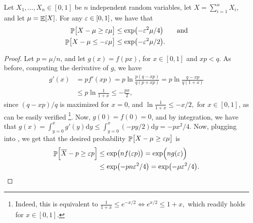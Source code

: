 \begin{theorem}
    Let $X_1, \ldots, X_n \in [0,1]$ be $n$ independent random
    variables, let $X = \sum_{i=1}^n X_i$, and let $\mu = \mathop{\mathbb{E}}\!\left[ {X} \right]$.
    For any ${\varepsilon} \in [0,1]$, we have that
    \begin{align*}
        \Prob{\bigl.{X} - \mu \geq \eps \mu }
        &\leq
        \exp\pth{ -\eps^2 \mu / 4}
        \qquad\text{and} \\
        \Prob{\bigl. X - \mu \leq -\eps \mu }
        &\leq
        \exp\pth{ - \eps^2 \mu/2}.
    \end{align*}
\end{theorem}
\begin{proof}
    Let $p = \mu /n$, and let $g(x) = f(px)$, for $x \in [0,1]$ and
    $xp < q$. As before, computing the derivative of $g$, we have
    \begin{align*}
        g'(x)%
        &=%
        p f'(xp)%
        =%
        p\ln \frac{p(q-xp)}{q(p+xp)} %
        =%
        p\ln \frac{q-xp}{q(1+x)} \\
        &\leq%
        p\ln \frac{1}{1+x}%
        \leq%
        - \frac{px}{2}, %
    \end{align*}
    since $(q-xp)/q$ is maximized for $x=0$, and
    \begin{math}
        \ln \frac{1}{1+x} \leq -x/2,
    \end{math}
    for $x \in [0,1]$, as can be easily verified%
    \footnote{Indeed, this is equivalent to
       \begin{math}
           \frac{1}{1+x} \leq e^{-x/2}%
           \iff%
           e^{x/2} \leq 1+x,
       \end{math}
       which readily holds for $x \in [0,1]$. %
    }. %
    Now, $g(0) =f (0) = 0$, and by integration, we have that
    \begin{math}
        g(x) =%
        \int_{y=0}^x g'(y) \mathrm{d} y %
        \leq%
        \int_{y=0}^x (-py/2) \mathrm{d} y %
        = -px^2/4.
    \end{math}
    Now, plugging into , we get
    that the desired probability
    \begin{math}
        \Prob{\bigl.{X} - \mu \geq \eps \mu }%
    \end{math}
    is %
    \begin{align*}%
        \ds%
        \Prob{\Bigl.\overline{X} - p \geq \eps p }%
        &\leq%
        \exp\pth{ \bigl. nf(\eps p)} = \exp\pth{ \Bigl. n g(\eps)} \\
        &\leq%
        \exp\pth{ \bigl. - p n\eps^2 /4}%
        =%
        \exp\pth{ \bigl. - \mu\eps^2 /4}.
    \end{align*}


\end{proof}
